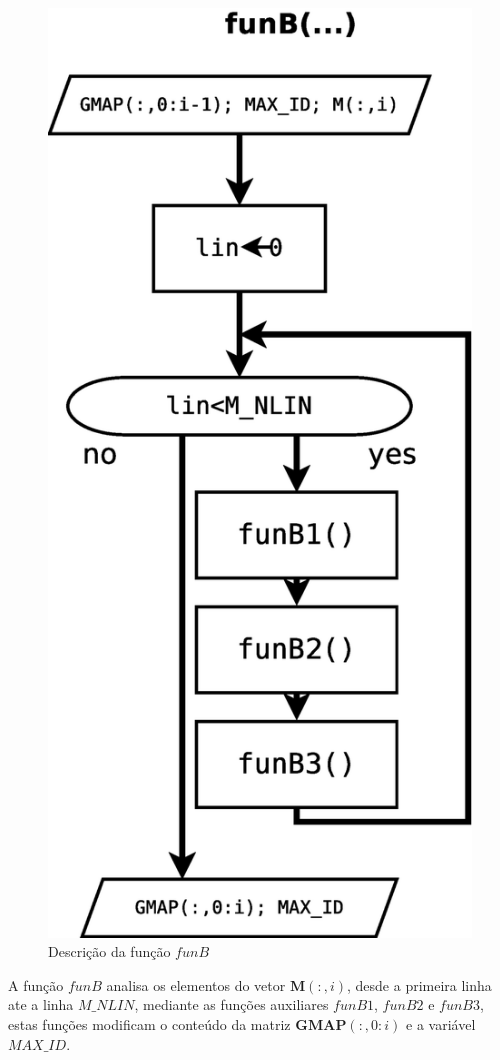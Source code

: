 \documentclass[a4paper,10pt]{article}
\begin{document}
\begin{figure}[!htb]
\centering
\includegraphics[scale=0.25]{funB.eps}
\caption{Descrição da função $funB$ }
\label{fig:funB}
\end{figure}
A função $funB$ analisa os elementos do vetor $\mathbf{M}(:,i)$, desde a primeira
linha ate a linha $M\_NLIN$, mediante as funções auxiliares $funB1$, $funB2$ e $funB3$,
estas funções modificam o conteúdo da matriz $\mathbf{GMAP}(:,0:i)$ e a variável $MAX\_ID$.
\end{document}
